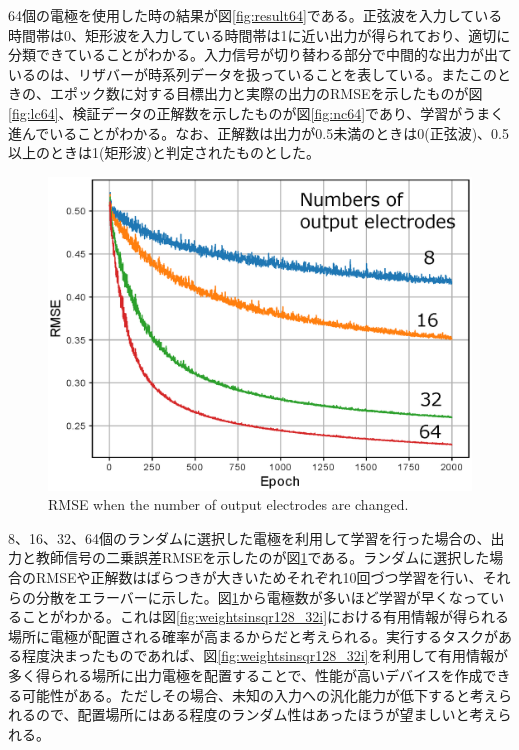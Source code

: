 \documentclass[a4j, twocolumn]{jsarticle}
\begin{document}
64個の電極を使用した時の結果が図\ref{fig:result64}である。正弦波を入力している時間帯は0、矩形波を入力している時間帯は1に近い出力が得られており、適切に分類できていることがわかる。入力信号が切り替わる部分で中間的な出力が出ているのは、リザバーが時系列データを扱っていることを表している。またこのときの、エポック数に対する目標出力と実際の出力のRMSEを示したものが図\ref{fig:lc64}、検証データの正解数を示したものが図\ref{fig:nc64}であり、学習がうまく進んでいることがわかる。なお、正解数は出力が0.5未満のときは0(正弦波)、0.5以上のときは1(矩形波)と判定されたものとした。

\begin{figure}
\centering
\includegraphics[width=1\hsize]{./figures/remsevs_r2.eps} 
\caption{RMSE when the number of output electrodes are changed.}
\label{fig:rmsevs}
\end{figure}

8、16、32、64個のランダムに選択した電極を利用して学習を行った場合の、出力と教師信号の二乗誤差RMSEを示したのが図\ref{fig:rmsevs}である。ランダムに選択した場合のRMSEや正解数はばらつきが大きいためそれぞれ10回づつ学習を行い、それらの分散をエラーバーに示した。図\ref{fig:rmsevs}から電極数が多いほど学習が早くなっていることがわかる。これは図\ref{fig:weightsinsqr128_32i}における有用情報が得られる場所に電極が配置される確率が高まるからだと考えられる。実行するタスクがある程度決まったものであれば、図\ref{fig:weightsinsqr128_32i}を利用して有用情報が多く得られる場所に出力電極を配置することで、性能が高いデバイスを作成できる可能性がある。ただしその場合、未知の入力への汎化能力が低下すると考えられるので、配置場所にはある程度のランダム性はあったほうが望ましいと考えられる。
\end{document}
